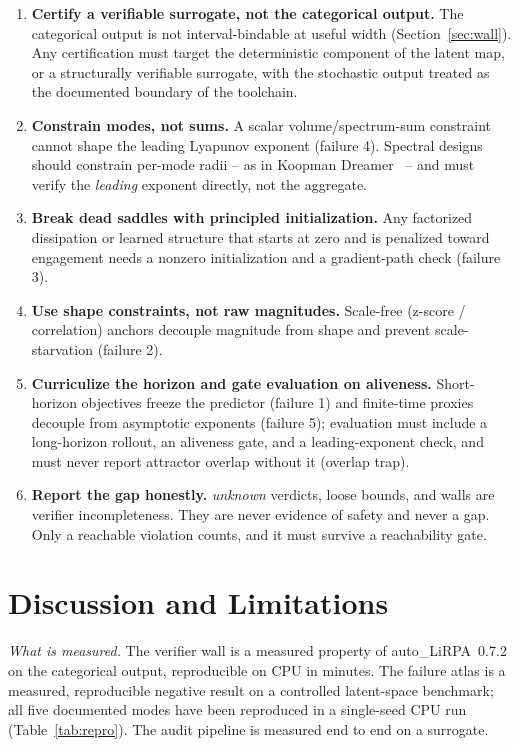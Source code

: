 \documentclass[journal]{IEEEtran}
\begin{document}
\begin{enumerate}
\item \textbf{Certify a verifiable surrogate, not the categorical output.}
The categorical output is not interval-bindable at useful width
(Section~\ref{sec:wall}). Any certification must target the deterministic
component of the latent map, or a structurally verifiable surrogate, with
the stochastic output treated as the documented boundary of the toolchain.
\item \textbf{Constrain modes, not sums.} A scalar volume/spectrum-sum
constraint cannot shape the leading Lyapunov exponent (failure 4). Spectral
designs should constrain per-mode radii -- as in
Koopman Dreamer~\cite{koopman2026} -- and must verify the \emph{leading}
exponent directly, not the aggregate.
\item \textbf{Break dead saddles with principled initialization.} Any
factorized dissipation or learned structure that starts at zero and is
penalized toward engagement needs a nonzero initialization and a
gradient-path check (failure 3).
\item \textbf{Use shape constraints, not raw magnitudes.} Scale-free
(z-score / correlation) anchors decouple magnitude from shape and prevent
scale-starvation (failure 2).
\item \textbf{Curriculize the horizon and gate evaluation on aliveness.}
Short-horizon objectives freeze the predictor (failure 1) and finite-time
proxies decouple from asymptotic exponents (failure 5); evaluation must
include a long-horizon rollout, an aliveness gate, and a leading-exponent
check, and must never report attractor overlap without it (overlap trap).
\item \textbf{Report the gap honestly.} \emph{unknown} verdicts, loose
bounds, and walls are verifier incompleteness. They are never evidence of
safety and never a gap. Only a reachable violation counts, and it must
survive a reachability gate.
\end{enumerate}

\section{Discussion and Limitations}\emph{What is measured.} The verifier wall is a measured property of
auto\_LiRPA~0.7.2 on the categorical output, reproducible on CPU in minutes.
The failure atlas is a measured, reproducible negative result on a
controlled latent-space benchmark; all five documented modes have been
reproduced in a single-seed CPU run (Table~\ref{tab:repro}). The audit
pipeline is measured end to end on a surrogate.
\end{document}
